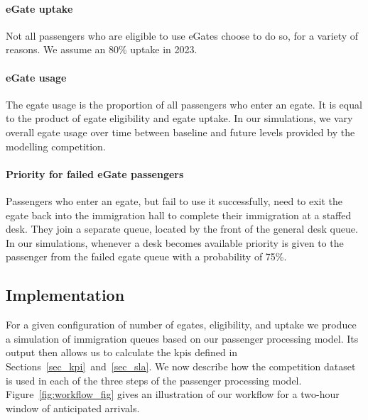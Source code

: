 \documentclass[10pt]{article}
\begin{document}
\paragraph{eGate uptake} 
Not all passengers who are eligible to use eGates choose to do so, for a variety of reasons. We assume an 80\% uptake in 2023. 

\paragraph{eGate usage}
The \gls{egate} usage is the proportion of all passengers who enter an \gls{egate}. It is equal to the product of \gls{egate} eligibility and \gls{egate} uptake. In our simulations, we vary overall \gls{egate} usage over time between baseline and future levels provided by the modelling competition.

\paragraph{Priority for failed eGate passengers}
Passengers who enter an \gls{egate}, but fail to use it successfully, need to exit the \gls{egate} back into the immigration hall to complete their immigration at a staffed desk. They join a separate queue, located by the front of the general desk queue. In our simulations, whenever a desk becomes available priority is given to the passenger from the failed \gls{egate} queue with a probability of 75\%.


\subsection{Implementation}

For a given configuration of number of \glspl{egate}, eligibility, and uptake we produce a simulation of immigration queues based on our passenger processing model. Its output then allows us to calculate the \glspl{kpi} defined in Sections~\ref{sec_kpi}~and~\ref{sec_sla}.  We now describe how the competition dataset is used in each of the three steps of the passenger processing model. Figure~\ref{fig:workflow_fig} gives an illustration of our workflow for a two-hour window of anticipated arrivals.
\end{document}
